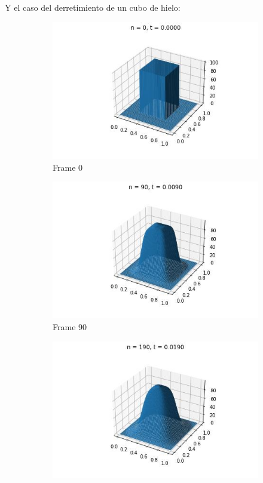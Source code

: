 \documentclass{article}
\begin{document}
Y el caso del derretimiento de un cubo de hielo:

\begin{figure} [H]
  \centering
  \begin{subfigure}{0.3\linewidth}
    \centering
    \includegraphics[width=\linewidth]{Cuadrada/3D/0.jpg}
    \caption{Frame 0}
  \end{subfigure}
  \begin{subfigure}{0.3\linewidth}
    \centering
    \includegraphics[width=\linewidth]{Cuadrada/3D/90.jpg}
    \caption{Frame 90}
  \end{subfigure}
  \begin{subfigure}{0.3\linewidth}
    \centering
    \includegraphics[width=\linewidth]{Cuadrada/3D/190.jpg}

\end{subfigure}
\end{figure}
\end{document}
